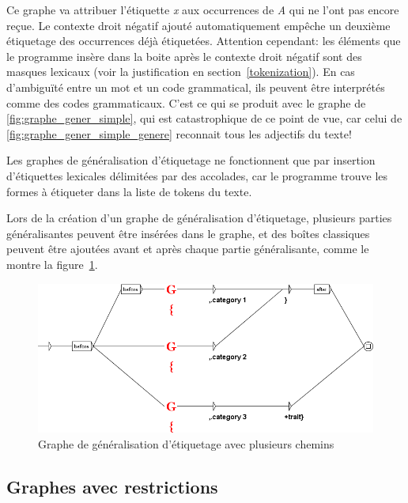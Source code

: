 \bigskip
\noindent Ce graphe va attribuer l'étiquette \textit{x} aux occurrences
de \textit{A} qui ne l'ont pas encore reçue. Le contexte droit négatif
ajouté automatiquement empêche un deuxième étiquetage des occurrences
déjà étiquetées. Attention cependant: les éléments que le programme insère dans la boite
après le contexte droit négatif sont des masques
lexicaux (voir la justification en section~\ref{tokenization}). En cas d'ambiguïté entre un mot
et un code grammatical, ils peuvent être interprétés comme des codes grammaticaux.
C'est ce qui se produit avec le graphe de \ref{fig:graphe_gener_simple},
qui est catastrophique de ce point de vue, car celui de \ref{fig:graphe_gener_simple_genere}
reconnait tous les adjectifs du texte!

\bigskip
\noindent Les graphes de g\'{e}n\'{e}ralisation d'\'{e}tiquetage ne fonctionnent
que par insertion d'étiquettes lexicales délimitées par des accolades, car le programme
trouve les formes à étiqueter dans la liste de tokens du texte.

\bigskip
\noindent Lors de la création d'un graphe de généralisation d'étiquetage, plusieurs
parties généralisantes peuvent être insérées dans le graphe, et des boîtes classiques
peuvent être ajoutées avant et après chaque partie généralisante, comme le montre
la figure~\ref{fig:graphe_gener_plusieurs_chemins}.

\begin{figure}[!htb]
  \centering
  \includegraphics[width=14cm]{resources/img/graphe_generique_plusieurs_chemins.png}
  \caption{Graphe de généralisation d'étiquetage avec plusieurs chemins}
  \label{fig:graphe_gener_plusieurs_chemins}
\end{figure}

\subsection{Graphes avec restrictions}

